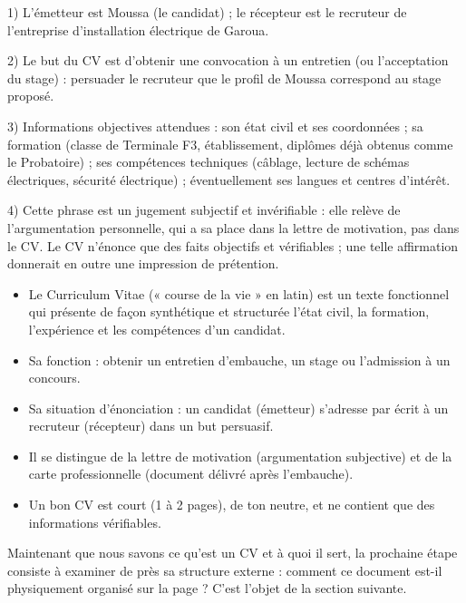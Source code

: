 \documentclass[11pt]{article}
\newcommand{\cle}[1]{{\popxbold\color{popdark}#1}}
\begin{document}
\begin{corrige}
1) L'émetteur est Moussa (le candidat) ; le récepteur est le recruteur de l'entreprise d'installation électrique de Garoua.

2) Le but du CV est d'obtenir une convocation à un entretien (ou l'acceptation du stage) : persuader le recruteur que le profil de Moussa correspond au stage proposé.

3) Informations objectives attendues : son état civil et ses coordonnées ; sa formation (classe de Terminale F3, établissement, diplômes déjà obtenus comme le Probatoire) ; ses compétences techniques (câblage, lecture de schémas électriques, sécurité électrique) ; éventuellement ses langues et centres d'intérêt.

4) Cette phrase est un jugement subjectif et invérifiable : elle relève de l'argumentation personnelle, qui a sa place dans la lettre de motivation, pas dans le CV. Le CV n'énonce que des faits objectifs et vérifiables ; une telle affirmation donnerait en outre une impression de prétention.
\end{corrige}

\begin{aretenir}
\begin{itemize}
\item Le Curriculum Vitae (« course de la vie » en latin) est un texte fonctionnel qui présente de façon synthétique et structurée l'état civil, la formation, l'expérience et les compétences d'un candidat.
\item Sa fonction : obtenir un entretien d'embauche, un stage ou l'admission à un concours.
\item Sa situation d'énonciation : un candidat (émetteur) s'adresse par écrit à un recruteur (récepteur) dans un but persuasif.
\item Il se distingue de la lettre de motivation (argumentation subjective) et de la carte professionnelle (document délivré après l'embauche).
\item Un bon CV est court (1 à 2 pages), de ton neutre, et ne contient que des informations vérifiables.
\end{itemize}
\end{aretenir}

Maintenant que nous savons ce qu'est un CV et à quoi il sert, la prochaine étape consiste à examiner de près sa \cle{structure externe} : comment ce document est-il physiquement organisé sur la page ? C'est l'objet de la section suivante.
\end{document}
